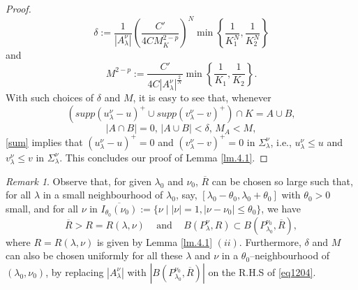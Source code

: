 \documentclass[12pt]{amsart}
\theoremstyle{definition}
\theoremstyle{remark}
\newtheorem{rem}[thm]{Remark}
\theoremstyle{conclusion}
\theoremstyle{conjecture}
\numberwithin{equation}{section}
\begin{document}
\begin{proof}
$$ \delta:= \frac{1}{|A_\lambda^\nu|}\left(\frac{C'}{4CM_K^{2-p}} \right)^N\min\left\{ \frac{1}{K_1^N}, \frac{1}{K_2^N} \right\}$$
and
$$ M^{2-p}:=\frac{C'}{4C|A_\lambda^\nu|^\frac{2}{N} }\min \left\{\frac{1}{K_1}, \frac{1}{K_2} \right\}.$$
With such choices of $\delta$ and $M$, it is easy to see that, whenever
$$ (supp(u^{\nu}_{\lambda}-u)^+\cup supp(v^{\nu}_{\lambda}-v)^+)\cap K=A\cup B,$$
$$|A\cap B|=0,\,|A\cup B|<\delta,\,M_A<M,$$
\eqref{sum} implies that $(u^{\nu}_{\lambda}-u)^+=0$ and $(v^{\nu}_{\lambda}-v)^+=0$ in $\Sigma_\lambda^\nu$, i.e., $u^{\nu}_{\lambda}\leq u$ and $v^{\nu}_{\lambda}\leq v$ in $\Sigma_\lambda^\nu$. This concludes our proof of Lemma \ref{lm.4.1}.
\end{proof}


\begin{rem}\label{re.4.1}
Observe that, for given $\lambda_0$ and $\nu_0$, $\overline{R}$ can be chosen so large such that, for all $\lambda$ in a small neighbourhood of $\lambda_0$, say, $[ \lambda_0-\theta_0 ,\lambda_0 + \theta_0 ]$ with $\theta_{0}>0$ small, and for all $\nu$ in $\overline{I_{\theta_0}(\nu_0)}:=\{ \nu \mid |\nu|=1,|\nu-\nu_0|\leq \theta_0 \}$, we have
$$ \overline{R}>R=R(\lambda,\nu)\,\quad \mbox{and}\,\quad B(P_\lambda^\nu,R)\subset B(P_{\lambda_0}^{\nu_0},\overline{R}), $$
where $R=R(\lambda,\nu)$ is given by Lemma \ref{lm.4.1} $(ii)$. Furthermore, $\delta$ and $M$ can also be chosen uniformly for all these $\lambda$ and $\nu$ in a $\theta_0$--neighbourhood of $(\lambda_0,\nu_0)$, by replacing $|A_\lambda^\nu|$ with $|B(P_{\lambda_0}^{\nu_0},\overline{R})|$ on the R.H.S of \eqref{eq1204}.
\end{rem}
\end{document}
